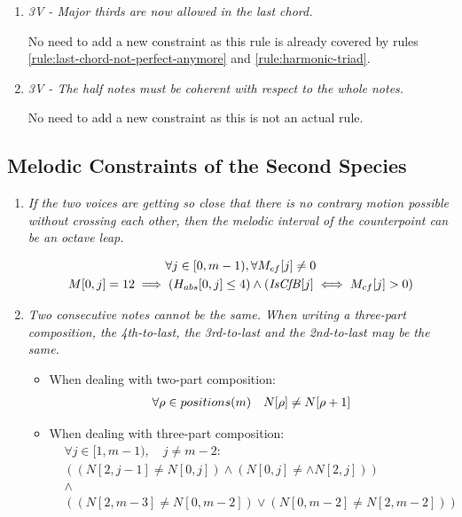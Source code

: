 \begin{enumerate}[wide, label=\bfseries 2.H\arabic*]
\item \textit{3V - Major thirds are now allowed in the last chord.}

No need to add a new constraint as this rule is already covered by rules \ref{rule:last-chord-not-perfect-anymore} and \ref{rule:harmonic-triad}.

\item \textit{3V - The half notes must be coherent with respect to the whole notes.}

No need to add a new constraint as this is not an actual rule.

\end{enumerate}

\subsection*{Melodic Constraints of the Second Species}
\begin{enumerate}[wide, label=\bfseries 2.M\arabic*]

\item\label{rule:octaveleap}{ \textit{If the two voices are getting so close that there is no contrary motion possible without crossing each other, then the melodic interval of the counterpoint can be an octave leap.}}

\begin{equation}
    \begin{gathered}
        \forall j \in [0, m-1), \forall M_{cf}[j] \neq 0\\
        M[0, j] = 12 \implies (H_{abs}[0, j] \leq 4) \land (\mathit{IsCfB}[j] \iff M_{cf}[j]>0)
    \end{gathered}
\end{equation}

\item\label{rule:notsamecons}{ \textit{Two consecutive notes cannot be the same. When writing a three-part composition, the 4th-to-last, the 3rd-to-last and the 2nd-to-last may be the same.}}

\begin{itemize} \item  When dealing with two-part composition:\begin{equation}
    \begin{gathered}
        \forall \rho \in positions(m) \quad
        N[\rho] \neq N[\rho+1]
    \end{gathered}
\end{equation}

\item When dealing with three-part composition:\begin{equation}
  \begin{aligned}
      &\forall j \in [1, m-1), \quad j \neq m-2:\\
      &((N[2, j-1] \neq N[0, j]) \land (N[0, j] \neq \land N[2, j])) \\
      &\land \\
      & ((N[2, m-3] \neq N[0, m-2]) \lor (N[0, m-2] \neq N[2, m-2]) )
  \end{aligned}
\end{equation}
\end{itemize}


\end{enumerate}
